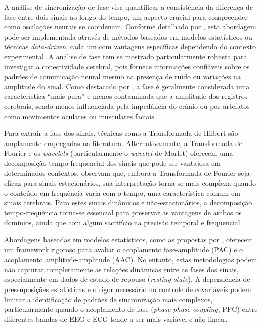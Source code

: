 A análise de sincronização de fase visa quantificar a consistência da diferença de fase entre dois sinais ao longo do tempo, um aspecto crucial para compreender como oscilações neurais se coordenam. Conforme detalhado por , esta abordagem pode ser implementada através de métodos baseados em modelos estatísticos ou técnicas \textit{data-driven}, cada um com vantagens específicas dependendo do contexto experimental. A análise de fase tem se mostrado particularmente robusta para investigar a conectividade cerebral, pois fornece informações confiáveis sobre os padrões de comunicação neural mesmo na presença de ruído ou variações na amplitude do sinal. Como destacado por , a fase é geralmente considerada uma característica ``mais pura'' e menos contaminada que a amplitude dos registros cerebrais, sendo menos influenciada pela impedância do crânio ou por artefatos como movimentos oculares ou musculares faciais.

Para extrair a fase dos sinais, técnicas como a Transformada de Hilbert são amplamente empregadas na literatura. Alternativamente, a Transformada de Fourier e os \textit{wavelets} (particularmente o \textit{wavelet} de Morlet) oferecem uma decomposição tempo-frequencial dos sinais que pode ser vantajosa em determinados contextos.  observam que, embora a Transformada de Fourier seja eficaz para sinais estacionários, sua interpretação torna-se mais complexa quando o conteúdo em frequência varia com o tempo, uma característica comum em sinais cerebrais. Para estes sinais dinâmicos e não-estacionários, a decomposição tempo-frequência torna-se essencial para preservar as vantagens de ambos os domínios, ainda que com algum sacrifício na precisão temporal e frequencial.

Abordagens baseadas em modelos estatísticos, como as propostas por , oferecem um framework rigoroso para avaliar o acoplamento fase-amplitude (PAC) e o acoplamento amplitude-amplitude (AAC). No entanto, estas metodologias podem não capturar completamente as relações dinâmicas entre as fases dos sinais, especialmente em dados de estado de repouso (\textit{resting-state}). A dependência de pressuposições estatísticas e o rigor necessário no controle de covariáveis podem limitar a identificação de padrões de sincronização mais complexos, particularmente quando o acoplamento de fase (\textit{phase-phase coupling}, PPC) entre diferentes bandas de EEG e ECG tende a ser mais variável e não-linear.

